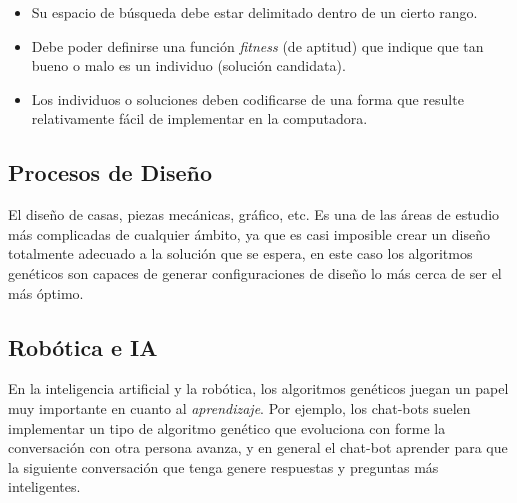 \documentclass[a4paper, 12pt]{article}
\begin{document}
\begin{itemize}
    \item Su espacio de búsqueda debe estar delimitado dentro de un cierto rango.
    \item Debe poder definirse una función \emph{fitness} (de aptitud) que indique que tan bueno o malo es un individuo (solución candidata).
    \item Los individuos o soluciones deben codificarse de una forma que resulte relativamente fácil de implementar en la computadora.
\end{itemize}

\subsection{Procesos de Diseño}
El diseño de casas, piezas mecánicas, gráfico, etc. Es una de las áreas de estudio más complicadas de cualquier ámbito, ya que es casi imposible crear un diseño totalmente adecuado a la solución que se espera, en este caso los algoritmos genéticos son capaces de generar configuraciones de diseño lo más cerca de ser el más óptimo.

\subsection{Robótica e IA}
En la inteligencia artificial y la robótica, los algoritmos genéticos juegan un papel muy importante en cuanto al \emph{aprendizaje}. Por ejemplo, los chat-bots suelen implementar un tipo de algoritmo genético que evoluciona con forme la conversación con otra persona avanza, y en general el chat-bot aprender para que la siguiente conversación que tenga genere respuestas y preguntas más inteligentes.



\nocite{*}
\end{document}
